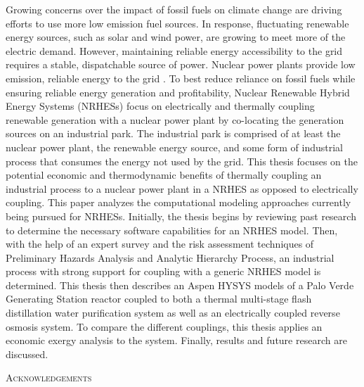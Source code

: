 \documentclass[12pt]{UIdahoMastersThesis}
\begin{document}
Growing concerns over the impact of fossil fuels on climate change are driving efforts to use more low emission fuel sources. In response, fluctuating renewable energy sources, such as solar and wind power, are growing to meet more of the electric demand. However, maintaining reliable energy accessibility to the grid requires a stable, dispatchable source of power. Nuclear power plants provide low emission, reliable energy to the grid \cite{IPCC}. To best reduce reliance on fossil fuels while ensuring reliable energy generation and profitability, Nuclear Renewable Hybrid Energy Systems (NRHESs) focus on electrically and thermally coupling renewable generation with a nuclear power plant by co-locating the generation sources on an industrial park. The industrial park is comprised of at least the nuclear power plant, the renewable energy source, and some form of industrial process that consumes the energy not used by the grid. This thesis focuses on the potential economic and thermodynamic benefits of thermally coupling an industrial process to a nuclear power plant in a NRHES as opposed to electrically coupling. This paper analyzes the computational modeling approaches currently being pursued for NRHESs. Initially, the thesis begins by reviewing past research to determine the necessary software capabilities for an NRHES model. Then, with the help of an expert survey and the risk assessment techniques of Preliminary Hazards Analysis and Analytic Hierarchy Process, an industrial process with strong support for coupling with a generic NRHES model is determined. This thesis then describes an Aspen HYSYS models of a Palo Verde Generating Station reactor coupled to both a thermal multi-stage flash distillation water purification system as well as an electrically coupled reverse osmosis system. To compare the different couplings, this thesis applies an economic exergy analysis to the system. Finally, results and future research are discussed.
\newpage

\begin{center}
 	{\LARGE\textsc{Acknowledgements}}
\end{center}
\end{document}
